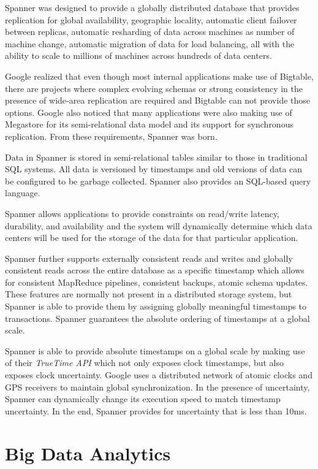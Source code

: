 \documentclass[]{article}
\begin{document}
Spanner was designed to provide a globally distributed database that provides replication for global availability, geographic locality, automatic client failover between replicas, automatic resharding of data across machines as number of machine change, automatic migration of data for load balancing, all with the ability to scale to millions of machines across hundreds of data centers.

Google realized that even though most internal applications make use of Bigtable, there are projects where complex evolving schemas or strong consistency in the presence of wide-area replication are required and Bigtable can not provide those options. Google also noticed that many applications were also making use of Megastore for its semi-relational data model and its support for synchronous replication. From these requirements, Spanner was born.

Data in Spanner is stored in semi-relational tables similar to those in traditional SQL systems. All data is versioned by timestamps and old versions of data can be configured to be garbage collected. Spanner also provides an SQL-based query language.

Spanner allows applications to provide constraints on read/write latency, durability, and availability and the system will dynamically determine which data centers will be used for the storage of the data for that particular application.

Spanner further supports externally consistent reads and writes and globally consistent reads across the entire database as a specific timestamp which allows for consistent MapReduce pipelines, consistent backups, atomic schema updates. These features are normally not present in a distributed storage system, but Spanner is able to provide them by assigning globally meaningful timestamps to transactions. Spanner guarantees the absolute ordering of timestamps at a global scale.

Spanner is able to provide absolute timestamps on a global scale by making use of their \textit{TrueTime API} which not only exposes clock timestamps, but also exposes clock uncertainty. Google uses a distributed network of atomic clocks and GPS receivers to maintain global synchronization. In the presence of uncertainty, Spanner can dynamically change its execution speed to match timestamp uncertainty. In the end, Spanner provides for uncertainty that is less than 10ms.


\section{Big Data Analytics} \label{sec:big-data-analytics}
\end{document}
